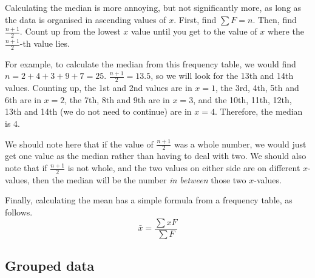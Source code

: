 Calculating the median is more annoying, but not significantly more, as long as the data is organised in ascending values of $x$. First, find $\sum F = n$. Then, find $\frac{n+1}{2}$. Count up from the lowest $x$ value until you get to the value of $x$ where the $\frac{n+1}{2}$-th value lies. 

For example, to calculate the median from this frequency table, we would find $n = 2+4+3+9+7 = 25$. $\frac{n+1}{2}=13.5$, so we will look for the 13th and 14th values. Counting up, the 1st and 2nd values are in $x=1$, the 3rd, 4th, 5th and 6th are in $x=2$, the 7th, 8th and 9th are in $x=3$, and the 10th, 11th, 12th, 13th and 14th (we do not need to continue) are in $x=4$. Therefore, the median is 4. 

We should note here that if the value of $\frac{n+1}{2}$ was a whole number, we would just get one value as the median rather than having to deal with two. We should also note that if $\frac{n+1}{2}$ is not whole, and the two values on either side are on different $x$-values, then the median will be the number \textit{in between} those two $x$-values.

Finally, calculating the mean has a simple formula from a frequency table, as follows. $$\bar{x}=\frac{\sum xF}{\sum F}$$

\subsection{Grouped data}